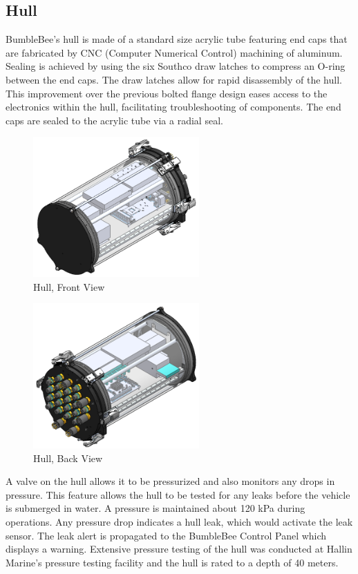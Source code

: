 \documentclass[journal,12pt]{IEEEtran}
\begin{document}
\subsection{Hull}
BumbleBee's hull is made of a standard size acrylic tube featuring end caps that are fabricated by CNC (Computer Numerical Control) machining of aluminum. Sealing is achieved by using the six Southco draw latches to compress an O-ring between the end caps. The draw latches allow for rapid disassembly of the hull. This improvement over the previous bolted flange design eases access to the electronics within the hull, facilitating troubleshooting of components. The end caps are sealed to the acrylic tube via a radial seal.

\begin{figure}[h]
\centering
\includegraphics[width=2.5in]{HullFrontview.png}
\caption{Hull, Front View}
\end{figure}

\begin{figure}[h]
\centering
\includegraphics[width=2.5in]{HullBackview.png}
\caption{Hull, Back View}
\end{figure}

A valve on the hull allows it to be pressurized and also monitors any drops in pressure. This feature allows the hull to be tested for any leaks before the vehicle is submerged in water. A pressure is maintained about 120 kPa during operations. Any pressure drop indicates a hull leak, which would activate the leak sensor. The leak alert is propagated to the BumbleBee Control Panel which displays a warning. Extensive pressure testing of the hull was conducted at Hallin Marine's pressure testing facility and the hull is rated to a depth of 40 meters. 
\end{document}
